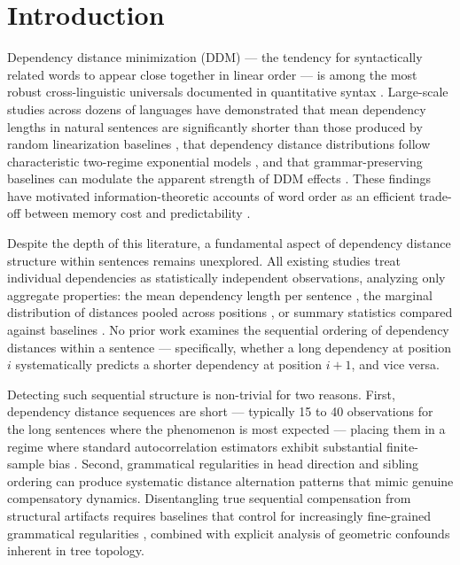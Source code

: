\documentclass[11pt,letterpaper]{article}
\begin{document}
\section{Introduction}

Dependency distance minimization (DDM) --- the tendency for syntactically related words to appear close together in linear order --- is among the most robust cross-linguistic universals documented in quantitative syntax \citep{Futrell2015, Liu2017, Temperley2018}. Large-scale studies across dozens of languages have demonstrated that mean dependency lengths in natural sentences are significantly shorter than those produced by random linearization baselines \citep{Futrell2015}, that dependency distance distributions follow characteristic two-regime exponential models \citep{Petrini2022}, and that grammar-preserving baselines can modulate the apparent strength of DDM effects \citep{Futrell2020a, Yadav2022}. These findings have motivated information-theoretic accounts of word order as an efficient trade-off between memory cost and predictability \citep{Hahn2021}.

Despite the depth of this literature, a fundamental aspect of dependency distance structure within sentences remains unexplored. All existing studies treat individual dependencies as statistically independent observations, analyzing only aggregate properties: the mean dependency length per sentence \citep{Futrell2015}, the marginal distribution of distances pooled across positions \citep{Petrini2022}, or summary statistics compared against baselines \citep{Futrell2020a, Yadav2022}. No prior work examines the sequential ordering of dependency distances within a sentence --- specifically, whether a long dependency at position $i$ systematically predicts a shorter dependency at position $i+1$, and vice versa.

Detecting such sequential structure is non-trivial for two reasons. First, dependency distance sequences are short --- typically 15 to 40 observations for the long sentences where the phenomenon is most expected --- placing them in a regime where standard autocorrelation estimators exhibit substantial finite-sample bias \citep{Krone2017, Shaman1988}. Second, grammatical regularities in head direction and sibling ordering can produce systematic distance alternation patterns that mimic genuine compensatory dynamics. Disentangling true sequential compensation from structural artifacts requires baselines that control for increasingly fine-grained grammatical regularities \citep{Futrell2020a, Yadav2022}, combined with explicit analysis of geometric confounds inherent in tree topology.
\end{document}
